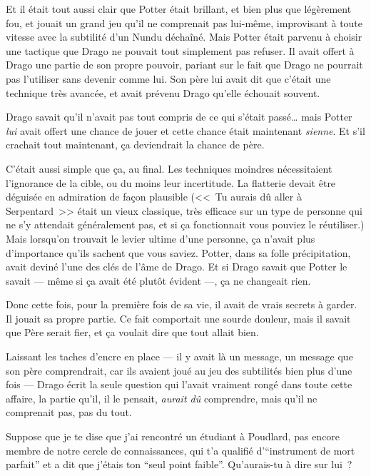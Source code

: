 Et il était tout aussi clair que Potter était brillant, et bien plus que légèrement fou, et jouait un grand jeu qu'il ne comprenait pas lui-même, improvisant à toute vitesse avec la subtilité d'un Nundu déchaîné. Mais Potter était parvenu à choisir une tactique que Drago ne pouvait tout simplement pas refuser. Il avait offert à Drago une partie de son propre pouvoir, pariant sur le fait que Drago ne pourrait pas l'utiliser sans devenir comme lui. Son père lui avait dit que c'était une technique très avancée, et avait prévenu Drago qu'elle échouait souvent.

Drago savait qu'il n'avait pas tout compris de ce qui s'était passé… mais Potter \emph{lui} avait offert une chance de jouer et cette chance était maintenant \emph{sienne}. Et s'il crachait tout maintenant, ça deviendrait la chance de père.

C'était aussi simple que ça, au final. Les techniques moindres nécessitaient l'ignorance de la cible, ou du moins leur incertitude. La flatterie devait être déguisée en admiration de façon plausible (<<~Tu aurais dû aller à Serpentard~>> était un vieux classique, très efficace sur un type de personne qui ne s'y attendait généralement pas, et si ça fonctionnait vous pouviez le réutiliser.) Mais lorsqu'on trouvait le levier ultime d'une personne, ça n'avait plus d'importance qu'ils sachent que vous saviez. Potter, dans sa folle précipitation, avait deviné l'une des clés de l'âme de Drago. Et si Drago savait que Potter le savait — même si ça avait été plutôt évident —, ça ne changeait rien.

Donc cette fois, pour la première fois de sa vie, il avait de vrais secrets à garder. Il jouait sa propre partie. Ce fait comportait une sourde douleur, mais il savait que Père serait fier, et ça voulait dire que tout allait bien.

Laissant les taches d'encre en place — il y avait là un message, un message que son père comprendrait, car ils avaient joué au jeu des subtilités bien plus d'une fois — Drago écrit la seule question qui l'avait vraiment rongé dans toute cette affaire, la partie qu'il, il le pensait, \emph{aurait dû} comprendre, mais qu'il ne comprenait pas, pas du tout.

\begin{writtenNote}

Suppose que je te dise que j'ai rencontré un étudiant à Poudlard, pas encore membre de notre cercle de connaissances, qui t'a qualifié d’“instrument de mort parfait” et a dit que j'étais ton “seul point faible”. Qu'aurais-tu à dire sur lui~?

\end{writtenNote}

